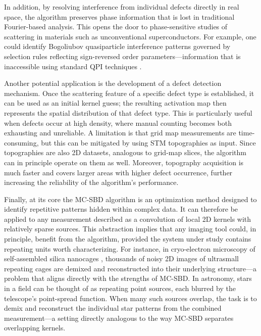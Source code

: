 In addition, by resolving interference from individual defects directly in real space, the algorithm preserves phase information that is lost in traditional Fourier-based analysis. This opens the door to phase-sensitive studies of scattering in materials such as unconventional superconductors. For example, one could identify Bogoliubov quasiparticle interference patterns governed by selection rules reflecting sign-reversed order parameters—information that is inaccessible using standard QPI techniques \cite{chiSignInversionSuperconducting2014}.

Another potential application is the development of a defect detection mechanism. Once the scattering feature of a specific defect type is established, it can be used as an initial kernel guess; the resulting activation map then represents the spatial distribution of that defect type. This is particularly useful when defects occur at high density, where manual counting becomes both exhausting and unreliable. A limitation is that grid map measurements are time-consuming, but this can be mitigated by using STM topographies as input. Since topographies are also 2D datasets, analogous to grid-map slices, the algorithm can in principle operate on them as well. Moreover, topography acquisition is much faster and covers larger areas with higher defect occurrence, further increasing the reliability of the algorithm’s performance.

Finally, at its core the MC-SBD algorithm is an optimization method designed to identify repetitive patterns hidden within complex data. It can therefore be applied to any measurement described as a convolution of local 2D kernels with relatively sparse sources. This abstraction implies that any imaging tool could, in principle, benefit from the algorithm, provided the system under study contains repeating units worth characterizing. For instance, in cryo-electron microscopy of self-assembled silica nanocages \cite{maSelfassemblyHighlySymmetrical2018}, thousands of noisy 2D images of ultrasmall repeating cages are demixed and reconstructed into their underlying structure—a problem that aligns directly with the strengths of MC-SBD. In astronomy, stars in a field can be thought of as repeating point sources, each blurred by the telescope’s point-spread function. When many such sources overlap, the task is to demix and reconstruct the individual star patterns from the combined measurement—a setting directly analogous to the way MC-SBD separates overlapping kernels.
